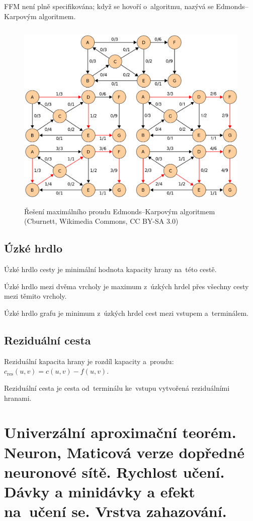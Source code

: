 FFM není plně specifikována; když se hovoří o~algoritmu, nazývá se Edmonds--Karpovým algoritmem.

\begin{figure}[ht]
\centering
\includegraphics[height=25em]{images/5_edmonds-karp}
\caption[Řešení maximálního proudu Edmonds--Karpovým algoritmem]{Řešení maximálního proudu Edmonds--Karpovým algoritmem\\{\small (Cburnett, Wikimedia Commons, CC BY-SA 3.0)}}
\end{figure}
\FloatBarrier

\subsection{Úzké hrdlo}

Úzké hrdlo cesty je minimální hodnota kapacity hrany na~této cestě.

Úzké hrdlo mezi dvěma vrcholy je maximum z~úzkých hrdel přes všechny cesty mezi těmito vrcholy.

Úzké hrdlo grafu je minimum z~úzkých hrdel cest mezi vstupem a~terminálem.

\subsection{Reziduální cesta}

Reziduální kapacita hrany je rozdíl kapacity a~proudu: $c_\mathrm{res}(u,v) = c(u,v) - f(u,v)$.

Reziduální cesta je cesta od~terminálu ke~vstupu vytvořená reziduálními hranami.

\clearpage
\section{Univerzální aproximační teorém. Neuron, Maticová verze dopředné neuronové sítě. Rychlost učení. Dávky a minidávky a efekt na~učení se. Vrstva zahazování.}

